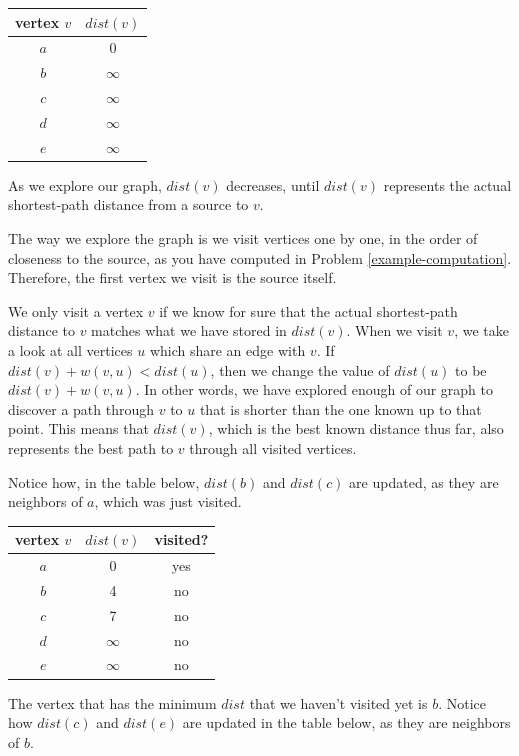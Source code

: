 \documentclass[11pt]{article}
\begin{document}
\begin{center}
\begin{tabular}{ c | c }
vertex $v$ & $dist(v)$ \\
\hline
$a$ & 0 \\
$b$ & $\infty$ \\
$c$ & $\infty$ \\
$d$ & $\infty$ \\
$e$ & $\infty$ 
\end{tabular}
\end{center}

As we explore our graph, $dist(v)$ decreases, until $dist(v)$ represents the actual shortest-path distance from a source to $v$.

The way we explore the graph is we visit vertices one by one, in the order of closeness to the source, as you have computed in Problem \ref{example-computation}.
Therefore, the first vertex we visit is the source itself.

We only visit a vertex $v$ if we know for sure that the actual shortest-path distance to $v$ matches what we have stored in $dist(v)$.
When we visit $v$, we take a look at all vertices $u$ which share an edge with $v$. If $dist(v) + w(v,u) < dist(u)$, then we change the value of $dist(u)$
to be $dist(v) + w(v,u)$. In other words, we have explored enough of our graph to discover a path through $v$ to $u$ that is shorter than the one known up to that point.
This means that $dist(v)$, which is the best known distance thus far, also represents the best path to $v$ through all visited vertices.

Notice how, in the table below, $dist(b)$ and $dist(c)$ are updated, as they are neighbors of $a$, which was just visited.

\begin{center}
\begin{tabular}{ c | c | c }
vertex $v$ & $dist(v)$ & visited? \\
\hline
$a$ & 0 & yes \\
$b$ & 4 & no \\
$c$ & 7 & no \\
$d$ & $\infty$ & no \\
$e$ & $\infty$ & no
\end{tabular}
\end{center}

The vertex that has the minimum $dist$ that we haven't visited yet is $b$. Notice how $dist(c)$ and $dist(e)$ are updated in the table below, as they are neighbors of $b$.
\end{document}
